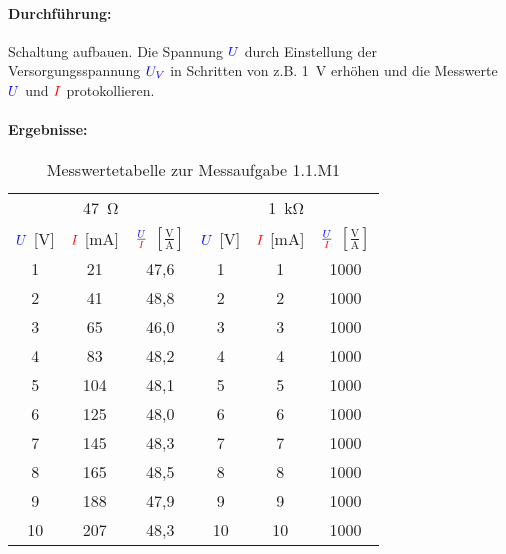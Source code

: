 \documentclass[11pt,a4paper,titlepage]{scrreprt}
\begin{document}
            \paragraph{Durchführung:} Schaltung aufbauen. Die Spannung $\textcolor{blue}{U}$ durch Einstellung der Versorgungsspannung $\textcolor{blue}{U_V}$ in Schritten von z.B. \SI{1}{\volt} erhöhen und die Messwerte $\textcolor{blue}{U}$ und $\textcolor{red}{I}$ protokollieren. 
          \paragraph{Ergebnisse:}
                 \begin{center}
                    \begin{table}[!hbtp]
                        \caption{Messwertetabelle zur Messaufgabe 1.1.M1}
                        \label{tbl:messergebnisse1.1}
                        \renewcommand{\arraystretch}{1.3}
                        \begin{center}
                            \begin{tabular}{ccc|ccc}
                                \multicolumn{3}{c}{\SI{47}{\ohm}} & \multicolumn{3}{c}{\SI{1}{\kilo\ohm}} \\ 
                                $\textcolor{blue}{U}$ [\si{\volt}] &
                                $\textcolor{red}{I}$ [\si{\milli\ampere}] &
                                $\frac{\textcolor{blue}{U}}{\textcolor{red}{I}}$ $\left[\frac{\si{\volt}}{\si{\ampere}}\right]$&
                                $\textcolor{blue}{U}$ [\si{\volt}] &
                                $\textcolor{red}{I}$ [\si{\milli\ampere}] &
                                $\frac{\textcolor{blue}{U}}{\textcolor{red}{I}}$ $\left[\frac{\si{\volt}}{\si{\ampere}}\right]$ \\ \hline
                                
                                1 & 21 & 47,6 & 1 & 1 & 1000\\
                                2 & 41 & 48,8 & 2 & 2 & 1000\\
                                3 & 65 & 46,0 & 3 & 3 & 1000\\
                                4 & 83 & 48,2 & 4 & 4 & 1000\\
                                5 & 104 & 48,1 & 5 & 5 & 1000\\
                                6 & 125 & 48,0 & 6 & 6 & 1000\\
                                7 & 145 & 48,3 & 7 & 7 & 1000\\
                                8 & 165 & 48,5 & 8 & 8 & 1000\\
                                9 & 188 & 47,9 & 9 & 9 & 1000\\
                                10 & 207 & 48,3 & 10 & 10 & 1000\\
                            \end{tabular}
                        \end{center}
                    \end{table}
                \end{center}
\end{document}
